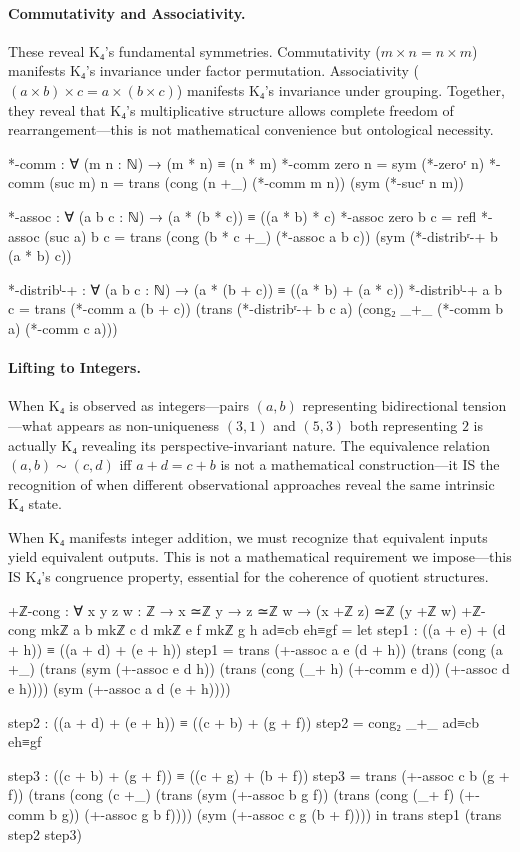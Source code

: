 \documentclass[11pt,a4paper]{book}
\begin{document}
\paragraph{Commutativity and Associativity.}
These reveal K₄'s fundamental symmetries. Commutativity ($m \times n = n \times m$) manifests K₄'s invariance under factor permutation. Associativity ($(a \times b) \times c = a \times (b \times c)$) manifests K₄'s invariance under grouping. Together, they reveal that K₄'s multiplicative structure allows complete freedom of rearrangement—this is not mathematical convenience but ontological necessity.

\begin{code}
*-comm : ∀ (m n : ℕ) → (m * n) ≡ (n * m)
*-comm zero    n = sym (*-zeroʳ n)
*-comm (suc m) n = trans (cong (n +_) (*-comm m n)) (sym (*-sucʳ n m))

*-assoc : ∀ (a b c : ℕ) → (a * (b * c)) ≡ ((a * b) * c)
*-assoc zero b c = refl
*-assoc (suc a) b c = 
  trans (cong (b * c +_) (*-assoc a b c)) (sym (*-distribʳ-+ b (a * b) c))

*-distribˡ-+ : ∀ (a b c : ℕ) → (a * (b + c)) ≡ ((a * b) + (a * c))
*-distribˡ-+ a b c = 
  trans (*-comm a (b + c))
        (trans (*-distribʳ-+ b c a)
               (cong₂ _+_ (*-comm b a) (*-comm c a)))
\end{code}

\paragraph{Lifting to Integers.}
When K₄ is observed as integers—pairs $(a, b)$ representing bidirectional tension—what appears as non-uniqueness $(3, 1)$ and $(5, 3)$ both representing $2$ is actually K₄ revealing its perspective-invariant nature. The equivalence relation $(a, b) \sim (c, d)$ iff $a + d = c + b$ is not a mathematical construction—it IS the recognition of when different observational approaches reveal the same intrinsic K₄ state.

When K₄ manifests integer addition, we must recognize that equivalent inputs yield equivalent outputs. This is not a mathematical requirement we impose—this IS K₄'s congruence property, essential for the coherence of quotient structures.

\begin{code}
+ℤ-cong : ∀ {x y z w : ℤ} → x ≃ℤ y → z ≃ℤ w → (x +ℤ z) ≃ℤ (y +ℤ w)
+ℤ-cong {mkℤ a b} {mkℤ c d} {mkℤ e f} {mkℤ g h} ad≡cb eh≡gf =
  let
    step1 : ((a + e) + (d + h)) ≡ ((a + d) + (e + h))
    step1 = trans (+-assoc a e (d + h)) 
            (trans (cong (a +_) (trans (sym (+-assoc e d h)) 
                   (trans (cong (_+ h) (+-comm e d)) (+-assoc d e h))))
            (sym (+-assoc a d (e + h))))
    
    step2 : ((a + d) + (e + h)) ≡ ((c + b) + (g + f))
    step2 = cong₂ _+_ ad≡cb eh≡gf
    
    step3 : ((c + b) + (g + f)) ≡ ((c + g) + (b + f))
    step3 = trans (+-assoc c b (g + f))
            (trans (cong (c +_) (trans (sym (+-assoc b g f))
                   (trans (cong (_+ f) (+-comm b g)) (+-assoc g b f))))
            (sym (+-assoc c g (b + f))))
  in trans step1 (trans step2 step3)
\end{code}
\end{document}
